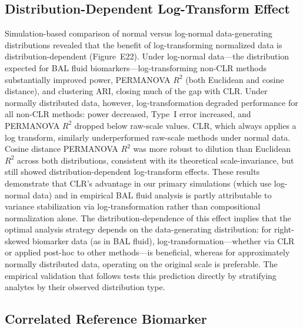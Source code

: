 \documentclass[12pt]{article}
\begin{document}
\subsection{Distribution-Dependent Log-Transform Effect}

Simulation-based comparison of normal versus log-normal data-generating distributions revealed that the benefit of log-transforming normalized data is distribution-dependent (Figure~E22). Under log-normal data---the distribution expected for BAL fluid biomarkers---log-transforming non-CLR methods substantially improved power, PERMANOVA $R^2$ (both Euclidean and cosine distance), and clustering ARI, closing much of the gap with CLR. Under normally distributed data, however, log-transformation degraded performance for all non-CLR methods: power decreased, Type~I error increased, and PERMANOVA $R^2$ dropped below raw-scale values. CLR, which always applies a log transform, similarly underperformed raw-scale methods under normal data. Cosine distance PERMANOVA $R^2$ was more robust to dilution than Euclidean $R^2$ across both distributions, consistent with its theoretical scale-invariance, but still showed distribution-dependent log-transform effects. These results demonstrate that CLR's advantage in our primary simulations (which use log-normal data) and in empirical BAL fluid analysis is partly attributable to variance stabilization via log-transformation rather than compositional normalization alone. The distribution-dependence of this effect implies that the optimal analysis strategy depends on the data-generating distribution: for right-skewed biomarker data (as in BAL fluid), log-transformation---whether via CLR or applied post-hoc to other methods---is beneficial, whereas for approximately normally distributed data, operating on the original scale is preferable. The empirical validation that follows tests this prediction directly by stratifying analytes by their observed distribution type.

\subsection{Correlated Reference Biomarker}
\end{document}
